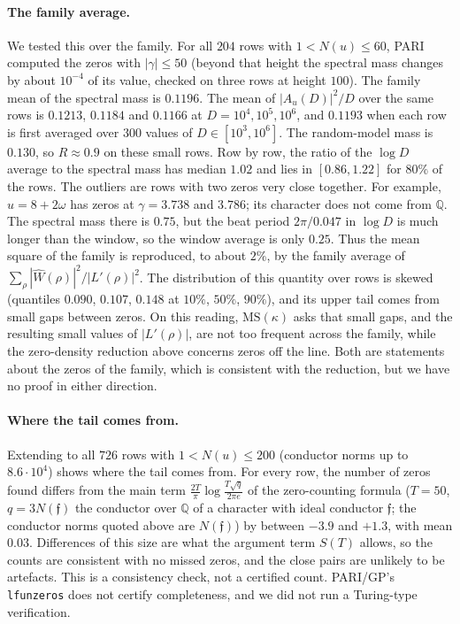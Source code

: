 \documentclass[11pt]{article}
\theoremstyle{remark}
\begin{document}
\paragraph{The family average.} We tested this over the family. For all $204$ rows with $1<N(u)\le60$, PARI computed the zeros
with $|\gamma|\le50$ (beyond that height the spectral mass changes by about $10^{-4}$ of its
value, checked on three rows at height $100$). The family mean of the spectral mass is
$0.1196$. The mean of $|A_u(D)|^2/D$ over the same rows is $0.1213$, $0.1184$ and $0.1166$ at
$D=10^4,10^5,10^6$, and $0.1193$ when each row is first averaged over $300$ values of
$D\in[10^3,10^6]$. The random-model mass is $0.130$, so $R\approx0.9$ on these small rows. Row
by row, the ratio of the $\log D$ average to the spectral mass has median $1.02$ and lies in
$[0.86,1.22]$ for $80\%$ of the rows. The outliers are rows with two zeros very close together.
For example, $u=8+2\omega$ has zeros at $\gamma=3.738$ and $3.786$; its character does not
come from $\mathbb Q$. The spectral mass there is $0.75$, but the beat period $2\pi/0.047$ in
$\log D$ is much longer than the window, so the window average is only $0.25$. Thus the mean
square of the family is reproduced, to about $2\%$, by the family average of
$\sum_\rho|\widehat W(\rho)|^2/|L'(\rho)|^2$. The distribution of this quantity over rows is
skewed (quantiles $0.090$, $0.107$, $0.148$ at $10\%$, $50\%$, $90\%$), and its upper tail
comes from small gaps between zeros. On this reading, $\mathrm{MS}(\kappa)$ asks that small
gaps, and the resulting small values of $|L'(\rho)|$, are not too frequent across the
family, while the zero-density reduction above concerns zeros off the line. Both are
statements about the zeros of the family, which is consistent with the reduction, but we
have no proof in either direction.

\paragraph{Where the tail comes from.} Extending to all $726$ rows with $1<N(u)\le200$ (conductor norms up to $8.6\cdot10^4$) shows
where the tail comes from. For every row, the number of zeros found differs from the main
term $\frac{2T}{\pi}\log\frac{T\sqrt q}{2\pi e}$ of the zero-counting formula ($T=50$, $q=3N(\mathfrak f)$ the
conductor over $\mathbb Q$ of a character with ideal conductor $\mathfrak f$; the conductor norms quoted above are $N(\mathfrak f)$) by between $-3.9$ and $+1.3$, with mean $0.03$. Differences of this size are what the
argument term $S(T)$ allows, so the counts are consistent with no missed zeros, and the close pairs are
unlikely to be artefacts. This is a consistency check, not a certified count. PARI/GP's
\texttt{lfunzeros} does not certify completeness, and we did not run a Turing-type verification.
\end{document}
